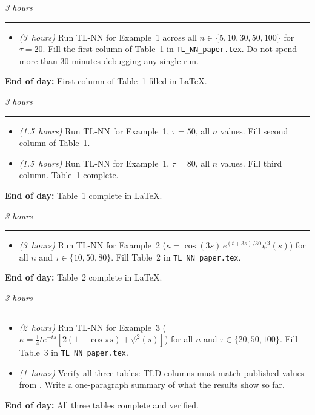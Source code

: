 \documentclass[12pt,a4paper]{article}
\newcommand{\hrs}[1]{\textit{\color{darkgray}(#1~hours)}}
\newcommand{\dayheading}[2]{%
  \vspace{0.3em}
  \noindent{\bfseries\color{darkblue}Day~#1}%
  \hfill{\small\color{darkgray}\textit{#2}}%
  \\[-0.4em]{\color{midgray}\rule{\linewidth}{0.4pt}}%
  \vspace{0.1em}
}
\begin{document}
\begin{tcolorbox}[daystyle]
\dayheading{11}{3 hours}
\begin{itemize}[leftmargin=1.8em,itemsep=3pt]
  \item[\color{midblue}$\bullet$]
    \hrs{3} Run TL-NN for Example~1 across all
    $n \in \{5, 10, 30, 50, 100\}$ for $\tau = 20$.
    Fill the first column of Table~1 in
    \texttt{TL\_NN\_paper.tex}.
    Do not spend more than 30 minutes debugging
    any single run.
\end{itemize}
\noindent\textbf{End of day:}
First column of Table~1 filled in \LaTeX.
\end{tcolorbox}

\begin{tcolorbox}[daystyle]
\dayheading{12}{3 hours}
\begin{itemize}[leftmargin=1.8em,itemsep=3pt]
  \item[\color{midblue}$\bullet$]
    \hrs{1.5} Run TL-NN for Example~1, $\tau = 50$,
    all $n$ values. Fill second column of Table~1.
  \item[\color{midblue}$\bullet$]
    \hrs{1.5} Run TL-NN for Example~1, $\tau = 80$,
    all $n$ values. Fill third column. Table~1 complete.
\end{itemize}
\noindent\textbf{End of day:} Table~1 complete in \LaTeX.
\end{tcolorbox}

\begin{tcolorbox}[daystyle]
\dayheading{13}{3 hours}
\begin{itemize}[leftmargin=1.8em,itemsep=3pt]
  \item[\color{midblue}$\bullet$]
    \hrs{3} Run TL-NN for Example~2
    ($\kappa = \cos(3s)\,e^{(t+3s)/30}\psi^3(s)$)
    for all $n$ and $\tau \in \{10, 50, 80\}$.
    Fill Table~2 in \texttt{TL\_NN\_paper.tex}.
\end{itemize}
\noindent\textbf{End of day:} Table~2 complete in \LaTeX.
\end{tcolorbox}

\begin{tcolorbox}[daystyle]
\dayheading{14}{3 hours}
\begin{itemize}[leftmargin=1.8em,itemsep=3pt]
  \item[\color{midblue}$\bullet$]
    \hrs{2} Run TL-NN for Example~3
    ($\kappa = \tfrac{1}{4}te^{-ts}
    [2(1 - \cos\pi s) + \psi^2(s)]$)
    for all $n$ and $\tau \in \{20, 50, 100\}$.
    Fill Table~3 in \texttt{TL\_NN\_paper.tex}.
  \item[\color{midblue}$\bullet$]
    \hrs{1} Verify all three tables: TLD columns must
    match published values from \cite{sedka2025}.
    Write a one-paragraph summary of what the results
    show so far.
\end{itemize}
\noindent\textbf{End of day:}
All three tables complete and verified.
\end{tcolorbox}
\end{document}
